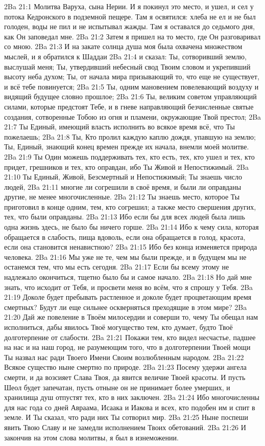 \vs 2Ba 21:1
Молитва Варуха, сына Нерии. И я покинул это место, и ушел, и сел у потока Кедронского в подземной пещере. Там я освятился: хлеба не ел и не был голоден, воды не пил и не испытывал жажды. Там я оставался до седьмого дня, как Он заповедал мне.
\vs 2Ba 21:2
Затем я пришел на то место, где Он разговаривал со мною.
\vs 2Ba 21:3
И на закате солнца душа моя была охвачена множеством мыслей, и я обратился к Шаддаи
\vs 2Ba 21:4
и сказал: Ты, сотворивший землю, выслушай меня; Ты, утвердивший небесный свод Твоим словом и укрепивший высоту неба духом; Ты, от начала мира призывающий то, что еще не существует, и всё тебе повинуется;
\vs 2Ba 21:5
Ты, одним мановением повелевающий воздуху и видящий будущее словно прошлое;
\vs 2Ba 21:6
Ты, великим советом управляющий силами, которые предстоят Тебе, и в гневе направляющий безчисленные святые создания, сотворенные Тобою из огня и пламени, окружающие Твой престол;
\vs 2Ba 21:7
Ты Единый, имеющий власть исполнить во всякое время всё, что Ты пожелаешь;
\vs 2Ba 21:8
Ты, Кто пролил каждую каплю дождя, упавшую на землю; Ты, Единый, знающий конец времен прежде их начала, внемли моей молитве.
\vs 2Ba 21:9
Ты Один можешь поддерживать тех, кто есть, тех, кто ушел и тех, кто придет, грешников и тех, кто оправдан, ибо Ты Живой и Непостижимый.
\vs 2Ba 21:10
Ты Единый, Живой, Безсмертный и Непостижимый; Ты знаешь число людей,
\vs 2Ba 21:11
многие ли согрешили в своё время, и были ли оправданы другие, не менее многочисленные.
\vs 2Ba 21:12
Ты знаешь место, которое Ты приготовил в конце одним, тем, кто согрешил; а также место свершения других, тех, что были оправданы.
\vs 2Ba 21:13
Ибо если бы для всех людей была лишь одна жизнь здесь, не было бы ничего горше.
\vs 2Ba 21:14
Ибо к чему сила, которая обращается в слабость, пища вдоволь, если она обращается в голод, красота, если она становится ненавистною?
\vs 2Ba 21:15
Ибо без конца изменяется природа человека.
\vs 2Ba 21:16
Мы уже не те, чем мы были прежде, и в будущем мы не останемся тем, что мы есть сегодня.
\vs 2Ba 21:17
Если бы всему этому не надлежало окончиться, тщетно было бы и самое начало.
\vs 2Ba 21:18
Но дай мне знать, что исходит от Тебя, и просвети меня во всём, что я спрошу у Тебя.
\vs 2Ba 21:19
Доколе будет пребывать растленное и доколе будет процветающим время смертных? Будут ли еще сильнее оскверняться преходящие в этом мире?
\vs 2Ba 21:20
Дай же повеление в Твоём милосердии и соверши то, чему Ты обещал нам исполниться, дабы явилось Твоё могущество тем, кто думает, будто Твоё долготерпение от слабости.
\vs 2Ba 21:21
Покажи тем, кто видел несчастье, падшее на нас и на наш город, не разумеющим того, что в долготерпении Твоей мощи Ты назвал нас ради Твоего Имени Своим возлюбленным народом.
\vs 2Ba 21:22
Всякое существо ныне смертно по природе.
\vs 2Ba 21:23
Посему удержи ангела смерти, и да возсияет Слава Твоя, да явится величие Твоей красоты. И пусть Шеол будет запечатан, пусть отныне он не принимает более умерших, и хранилища душ отпустят тех, кто в них заключен.
\vs 2Ba 21:24
Ибо многочисленны для нас года со дней Авраама, Исаака и Иакова и всех, кто подобен им и спит в земле. И Ты сказал, что ради них Ты сотворил мир.
\vs 2Ba 21:25
Ныне поспеши явить Твою Славу и не замедли исполнением Твоих обетований.
\vs 2Ba 21:26
И закончив на этом слова молитвы, я был в изнеможении.


